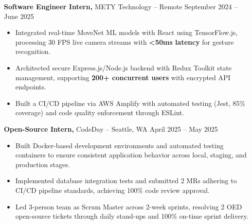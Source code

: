 \documentclass[11pt]{article}       %
\begin{document}
\textbf{Software Engineer Intern,} {METY Technology} -- Remote \hfill September 2024 -- June 2025
\vspace{-9pt}
\begin{itemize}
  \item Integrated real-time MoveNet ML models with React using TensorFlow.js, processing 30 FPS live camera streams with \textbf{<50ms latency} for gesture recognition.
  \item Architected secure Express.js/Node.js backend with Redux Toolkit state management, supporting \textbf{200+ concurrent users} with encrypted API endpoints.
  \item Built a CI/CD pipeline via AWS Amplify with automated testing (Jest, 85\% coverage) and code quality enforcement through ESLint.
\end{itemize}

\textbf{Open-Source Intern,} {CodeDay} -- Seattle, WA \hfill April 2025 -- May 2025
\vspace{-9pt}
\begin{itemize}
  \item Built Docker-based development environments and automated testing containers to ensure consistent application behavior across local, staging, and production stages.
  \item Implemented database integration tests and submitted 2 MRs adhering to CI/CD pipeline standards, achieving 100\% code review approval.
  \item Led 3-person team as Scrum Master across 2-week sprints, resolving 2 OED open-source tickets through daily stand-ups and 100\% on-time sprint delivery.
\end{itemize}

\end{document}
